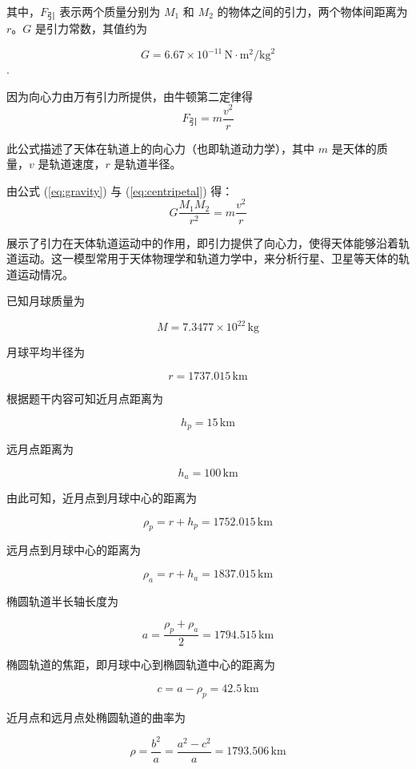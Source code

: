 \documentclass{ctexart}
\begin{document}
其中，\( F_{\text{引}}\) 表示两个质量分别为 \( M_1 \) 和 \( M_2 \) 的物体之间的引力，两个物体间距离为 \( r \)。\( G \) 是引力常数，其值约为 

\[
G = 6.67 \times 10^{-11} \, \text{N} \cdot \text{m}^2 / \text{kg}^2
\].


因为向心力由万有引力所提供，由牛顿第二定律得
\begin{equation}
F_{\text{引}} = m \frac{v^2}{r}
\label{eq:centripetal}
\end{equation}

此公式描述了天体在轨道上的向心力（也即轨道动力学），其中 \( m \) 是天体的质量，\( v \) 是轨道速度，\( r \) 是轨道半径。

由公式 (\ref{eq:gravity}) 与 (\ref{eq:centripetal}) 得：
\begin{equation}
G \frac{M_1 M_2}{r^2} = m \frac{v^2}{r}
\label{eq:3}
\end{equation}

展示了引力在天体轨道运动中的作用，即引力提供了向心力，使得天体能够沿着轨道运动。这一模型常用于天体物理学和轨道力学中，来分析行星、卫星等天体的轨道运动情况。

已知月球质量为

\[M = 7.3477 \times 10^{22} \, \text{kg}\]


月球平均半径为

\[r = 1737.015 \, \text{km}\]


根据题干内容可知近月点距离为

\[h_p = 15 \, \text{km}\]

远月点距离为

\[h_a = 100 \, \text{km}\]

由此可知，近月点到月球中心的距离为

\[\rho_p = r + h_p = 1752.015 \, \text{km}\]

远月点到月球中心的距离为

\[\rho_a = r + h_a = 1837.015 \, \text{km}\]

椭圆轨道半长轴长度为

\[a = \frac{\rho_p + \rho_a}{2} = 1794.515 \, \text{km}\]


椭圆轨道的焦距，即月球中心到椭圆轨道中心的距离为

\[c = a - \rho_p = 42.5 \, \text{km}\]

近月点和远月点处椭圆轨道的曲率为

\[\rho = \frac{b^2}{a} = \frac{a^2 - c^2}{a} = 1793.506 \, \text{km}\]
\end{document}
